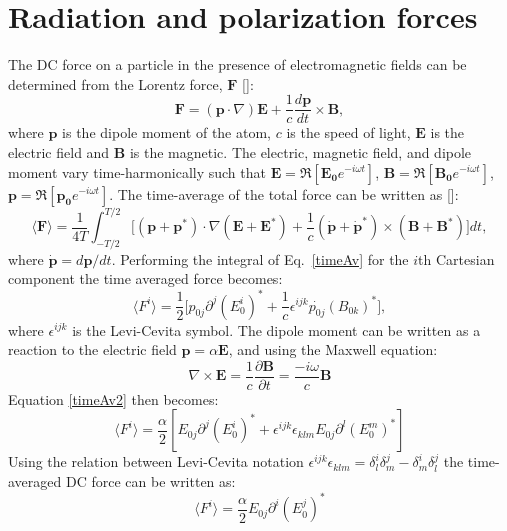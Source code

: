 \section{Radiation and polarization forces}
The DC force on a particle in the presence of electromagnetic fields can be determined from the Lorentz force, $\mathbf{F}$ [\cite{Gordon}]:
\begin{equation}
\mathbf{F} = (\mathbf{p}\cdot\nabla)\mathbf{E}+\frac{1}{c}\frac{d\mathbf{p}}{dt}\times \mathbf{B},
\label{force1}
\end{equation}
where $\mathbf{p}$ is the dipole moment of the atom, $c$ is the speed of light, $\mathbf{E}$ is the electric field and $\mathbf{B}$ is the magnetic. The electric, magnetic field, and dipole moment vary time-harmonically such that $\mathbf{E} = \Re[\mathbf{E_0}e^{-i\omega t}]$, $\mathbf{B} = \Re[\mathbf{B_0}e^{-i\omega t}]$, $\mathbf{p} = \Re[\mathbf{p_0}e^{-i\omega t}]$. The time-average of the total force can be written as [\cite{Chaumet}]:
\begin{equation}
\langle \mathbf{F}\rangle = \frac{1}{4T}\int_{-T/2}^{T/2}\big[(\mathbf{p}+\mathbf{p}^*)\cdot\nabla(\mathbf{E}+\mathbf{E}^*)+\frac{1}{c}(\dot{\mathbf{p}}+\dot{\mathbf{p}}^*)\times(\mathbf{B}+\mathbf{B}^*)\big]dt,
\label{timeAv}
\end{equation}
where $\dot{\mathbf{p}} = d\mathbf{p}/dt$. Performing the integral of Eq.~\ref{timeAv} for the $i$th Cartesian component the time averaged force becomes:
\begin{equation}
\langle F^i\rangle = \frac{1}{2}\big[p_{0j}\partial^j(E_0^i)^*+\frac{1}{c}\epsilon^{ijk}\dot{p_{0j}}(B_{0k})^*\big],
\label{timeAv2}
\end{equation}
where $\epsilon^{ijk}$ is the Levi-Cevita symbol. The dipole moment can be written as a reaction to the electric field $\mathbf{p}=\alpha \mathbf{E}$, and using the Maxwell equation:
\begin{equation}
\nabla\times \mathbf{E} = \frac{1}{c}\frac{\partial \mathbf{B}}{\partial t} = \frac{-i\omega}{c}\mathbf{B}
\end{equation}
Equation \ref{timeAv2} then becomes:
\begin{equation}
\langle F^i\rangle =\frac{\alpha}{2}[E_{0j}\partial^j(E^i_0)^*+\epsilon^{ijk}\epsilon_{klm}E_{0j}\partial^l(E_0^m)^*]
\end{equation}
Using the relation between Levi-Cevita notation $\epsilon^{ijk}\epsilon_{klm} = \delta^i_l\delta^j_m-\delta_m^i\delta_l^j$ the time-averaged DC force can be written as:
\begin{equation}
\langle F^i\rangle = \frac{\alpha}{2}E_{0j}\partial^i(E_0^j)^*
\end{equation}
